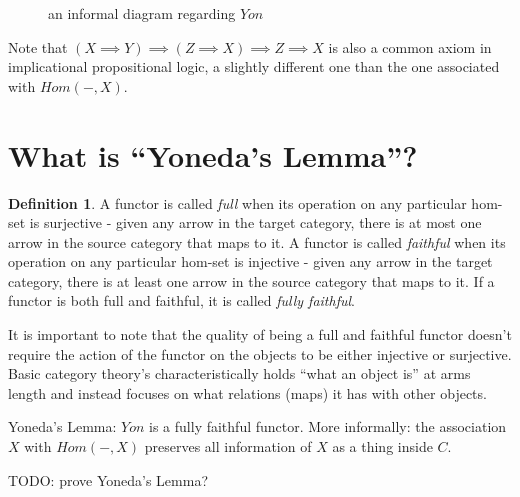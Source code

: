 \documentclass{proc-l}
\theoremstyle{definition}
\newtheorem{definition}[theorem]{Definition}
\theoremstyle{remark}
\numberwithin{equation}{section}
\begin{document}
\begin{figure}[h]


\caption{an informal diagram regarding $Yon$}
\label{yonfig}

\end{figure}

%

Note that $(X \implies Y) \implies (Z \implies X) \implies Z \implies X$ is also a common axiom in implicational propositional logic, a slightly different one than the one associated with $Hom(-, X)$.

\section{What is ``Yoneda's Lemma''?}

\begin{definition}
\label{fulldefn}
\label{faithfuldefn}
A functor is called \emph{full} when its operation on any particular hom-set is surjective - given any arrow in the target category, there is at most one arrow in the source category that maps to it. A functor is called \emph{faithful} when its operation on any particular hom-set is injective - given any arrow in the target category, there is at least one arrow in the source category that maps to it. If a functor is both full and faithful, it is called \emph{fully faithful}.
\end{definition}

It is important to note that the quality of being a full and faithful functor doesn't require the action of the functor on the objects to be either injective or surjective. Basic category theory's characteristically holds ``what an object is'' at arms length and instead focuses on what relations (maps) it has with other objects.

Yoneda’s Lemma: $Yon$ is a fully faithful functor. More informally: the association $X$ with $Hom(-,X)$ preserves all information of $X$ as a thing inside $C$.

TODO: prove Yoneda's Lemma?
\end{document}
